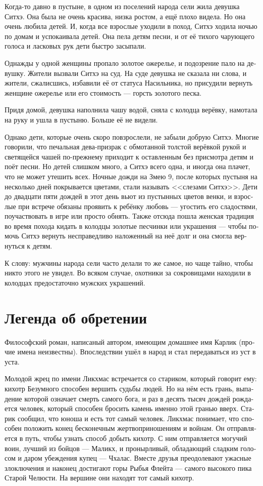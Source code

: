 \documentclass[a4paper,12pt,fleqn]{book}\usepackage{cooltooltips}\usepackage{polyglossia}\setdefaultlanguage[babelshorthands=true]{russian}\setotherlanguage{english}\defaultfontfeatures{Ligatures=TeX,Mapping=tex-text} \usepackage{xcolor}\definecolor{lightgray}{HTML}{bbbbbb}\color{lightgray}\newcommand{\ml}[3]{\textenglish{\textcolor{black}{#3}}}
\begin{document}
{Когда-то давно в пустыне, в одном из поселений народа сели жила девушка Ситхэ.
Она была не очень красива, низка ростом, а ещё плохо видела.
Но она очень любила детей.
И, когда все взрослые уходили в поход, Ситхэ ходила ночью по домам и успокаивала детей.
Она пела детям песни, и от её тихого чарующего голоса и ласковых рук дети быстро засыпали.

Однажды у одной женщины пропало золотое ожерелье, и подозрение пало на девушку.
Жители вызвали Ситхэ на суд.
На суде девушка не сказала ни слова, и жители, сжалисшись, избавили её от статуса Насильника, но присудили вернуть женщине ожерелье или его стоимость --- горсть золотого песка.

Придя домой, девушка наполнила чашу водой, сняла с колодца верёвку, намотала на руку и ушла в пустыню.
Больше её не видели.

Однако дети, которые очень скоро повзрослели, не забыли добрую Ситхэ.
Многие говорили, что печальная дева-призрак с обмотанной толстой верёвкой рукой и светящейся чашей по-прежнему приходит к оставленным без присмотра детям и поёт песни.
Но детей слишком много, а Ситхэ всего одна, и иногда она плачет, что не может утешить всех.
Ночные дожди на Змею 9, после которых пустыня на несколько дней покрывается цветами, стали называть <<слезами Ситхэ>>.
Дети до двадцати пяти дождей в этот день вьют из пустынных цветов венки, и взрослые при встрече обязаны проявить к ребёнку любовь --- угостить его сладостями, поучаствовать в игре или просто обнять.
Также отсюда пошла женская традиция во время похода кидать в колодцы золотые песчинки или украшения --- чтобы помочь Ситхэ вернуть несправедливо наложенный на неё долг и она смогла вернуться к детям.

К слову: мужчины народа сели часто делали то же самое, но чаще тайно, чтобы никто этого не увидел.
Во всяком случае, охотники за сокровищами находили в колодцах предостаточно мужских украшений.

\section{Легенда об обретении}

Философский роман, написаный автором, имеющим домашнее имя Карлик (прочие имена неизвестны).
Впоследствии ушёл в народ и стал передаваться из уст в уста.

Молодой жрец по имени Ликхмас встречается со стариком, который говорит ему: кихотр Безумного способен вершить судьбы людей.
Но на нём есть грань, выпадение которой означает смерть самого бога, и раз в десять тысяч дождей рождается человек, который способен бросить камень именно этой гранью вверх.
Старик сообщил, что юноша и есть тот самый человек.
Ликхмас понимает, что способен положить конец бесконечным жертвоприношениям и войнам.
Он отправляется в путь, чтобы узнать способ добыть кихотр.
С ним отправляется могучий воин, лучший из бойцов --- Маликх, и пронырливый, обладающий сладким голосом и даром убеждения купец --- Чхалас.
Вместе друзья преодолевают ужасные злоключения и наконец достигают горы Рыбья Флейта --- самого высокого пика Старой Челюсти.
На вершине они находят тот самый кихотр.

}
\end{document}
